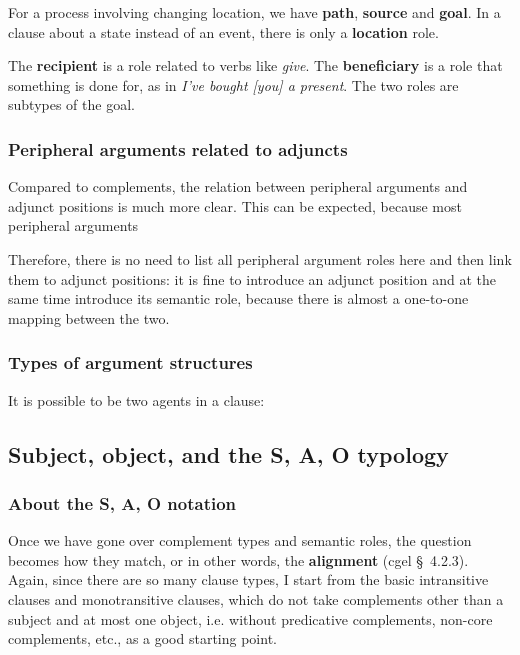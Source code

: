 \documentclass{article}
\newcommand*{\citesec}[1]{\S~{#1}}
\newcommand*{\concept}[1]{\textbf{#1}}
\newcommand*{\corpus}[1]{\emph{#1}}
\begin{document}
For a process involving changing location,
we have \concept{path}, \concept{source} and \concept{goal}.
In a clause about a state instead of an event,
there is only a \concept{location} role.

The \concept{recipient} is a role related to verbs like \corpus{give}.
The \concept{beneficiary} is a role that something is done for,
as in \corpus{I've bought [you] a present}.
The two roles are subtypes of the goal.

\subsubsection{Peripheral arguments related to adjuncts}

Compared to complements, the relation between peripheral arguments and adjunct positions 
is much more clear. 
This can be expected, because most peripheral arguments %

Therefore, there is no need to list all peripheral argument roles here 
and then link them to adjunct positions: 
it is fine to introduce an adjunct position and at the same time introduce its semantic role,
because there is almost a one-to-one mapping between the two.


\subsubsection{Types of argument structures}

It is possible to be two agents in a clause: 

\subsection{Subject, object, and the S, A, O typology}

\subsubsection{About the S, A, O notation}

Once we have gone over complement types and semantic roles,
the question becomes how they match, or in other words, the \concept{alignment}
(\ac{cgel} \citesec{4.2.3}).
Again, since there are so many clause types, 
I start from the basic intransitive clauses and monotransitive clauses,
which do not take complements other than a subject and at most one object, 
i.e. without predicative complements, 
non-core complements, etc.,
as a good starting point.
\end{document}

